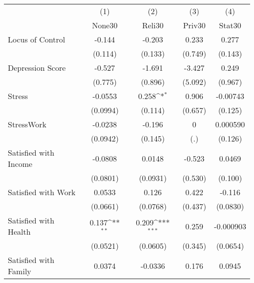 {
\def\sym#1{\ifmmode^{#1}\else\(^{#1}\)\fi}
\begin{tabular}{l*{4}{c}}
\hline\hline
            &\multicolumn{1}{c}{(1)}&\multicolumn{1}{c}{(2)}&\multicolumn{1}{c}{(3)}&\multicolumn{1}{c}{(4)}\\
            &\multicolumn{1}{c}{None30}&\multicolumn{1}{c}{Reli30}&\multicolumn{1}{c}{Priv30}&\multicolumn{1}{c}{Stat30}\\
\hline
Locus of Control&      -0.144         &      -0.203         &       0.233         &       0.277         \\
            &     (0.114)         &     (0.133)         &     (0.749)         &     (0.143)         \\
[1em]
Depression Score&      -0.527         &      -1.691         &      -3.427         &       0.249         \\
            &     (0.775)         &     (0.896)         &     (5.092)         &     (0.967)         \\
[1em]
Stress      &     -0.0553         &       0.258\sym{*}  &       0.906         &    -0.00743         \\
            &    (0.0994)         &     (0.114)         &     (0.657)         &     (0.125)         \\
[1em]
StressWork  &     -0.0238         &      -0.196         &           0         &    0.000590         \\
            &    (0.0942)         &     (0.145)         &         (.)         &     (0.126)         \\
[1em]
Satisfied with Income&     -0.0808         &      0.0148         &      -0.523         &      0.0469         \\
            &    (0.0801)         &    (0.0931)         &     (0.530)         &     (0.100)         \\
[1em]
Satisfied with Work&      0.0533         &       0.126         &       0.422         &      -0.116         \\
            &    (0.0661)         &    (0.0768)         &     (0.437)         &    (0.0830)         \\
[1em]
Satisfied with Health&       0.137\sym{**} &       0.209\sym{***}&       0.259         &   -0.000903         \\
            &    (0.0521)         &    (0.0605)         &     (0.345)         &    (0.0654)         \\
[1em]
Satisfied with Family&      0.0374         &     -0.0336         &       0.176         &      0.0945         \\

\end{tabular}}
